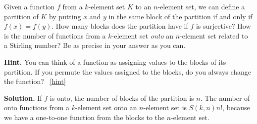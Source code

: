 \documentclass{book}
\begin{document}
\setcounter{project}{203}
\addtocounter{project}{-1}
\begin{activity}[]\label{activity-196}
\hypertarget{p-1138}{}%
Given a function \(f\) from a \(k\)-element set \(K\) to an \(n\)-element set, we can define a partition of \(K\) by putting \(x\) and \(y\) in the same block of the partition if and only if \(f(x)=f(y)\). How many blocks does the partition have if \(f\) is surjective? How is the number of functions from a \(k\)-element set \emph{onto} an \(n\)-element set related to a Stirling number? Be as precise in your answer as you can.%
\par\smallskip%
\noindent\textbf{Hint.}\hypertarget{hint-128}{}\quad%
\hypertarget{p-1139}{}%
You can think of a function as assigning values to the blocks of its partition. If you permute the values assigned to the blocks, do you always change the function?%
~\hfill{\tiny\hyperlink{a-203}{[hint]}\hypertarget{q-203}{}}\par\smallskip%
\noindent\textbf{Solution.}\hypertarget{solution-112}{}\quad%
\hypertarget{p-1140}{}%
If \(f\) is onto, the number of blocks of the partition is \(n\). The number of onto functions from a \(k\)-element set onto an \(n\)-element set is \(S(k,n)n!\), because we have a one-to-one function from the blocks to the \(n\)-element set.%
\end{activity}
\end{document}
